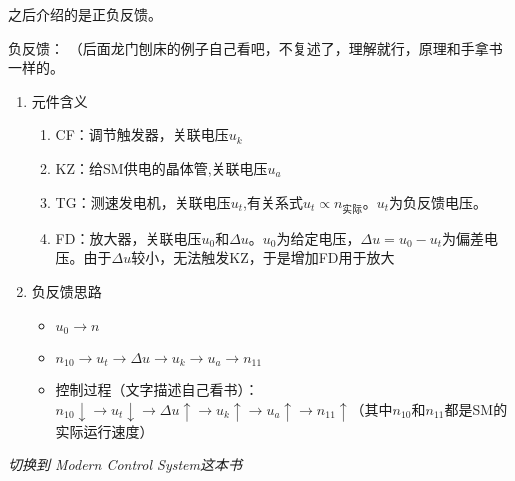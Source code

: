 \documentclass[oneside,a4paper]{ctexbook}
\begin{document}
之后介绍的是正负反馈。

负反馈：
（后面龙门刨床的例子自己看吧，不复述了，理解就行，原理和手拿书一样的。
\begin{enumerate}
    \item 元件含义
    \begin{enumerate}
        \item CF：调节触发器，关联电压$u_k$
        \item KZ：给SM供电的晶体管,关联电压$u_a$
        \item TG：测速发电机，关联电压$u_t$,有关系式$u_t\propto n_{实际}$。$u_t$为负反馈电压。
        \item FD：放大器，关联电压$u_0$和$\Delta u$。$u_0$为给定电压，$\Delta u = u_0 - u_t$为偏差电压。由于$\Delta u$较小，无法触发KZ，于是增加FD用于放大
    \end{enumerate}
    \item 负反馈思路
    \begin{itemize}
        \item $u_0 \to n$
        \item $n_{10} \to u_t \to \Delta u \to u_k \to u_a \to n_{11}$
        \item 控制过程（文字描述自己看书）：$n_{10}\downarrow \to u_t\downarrow \to \Delta u\uparrow \to u_k\uparrow \to u_a\uparrow \to n_{11}\uparrow$（其中$n_{10}$和$n_{11}$都是SM的实际运行速度）
    \end{itemize}
\end{enumerate}




\emph{切换到 Modern Control System这本书}




\end{document}
